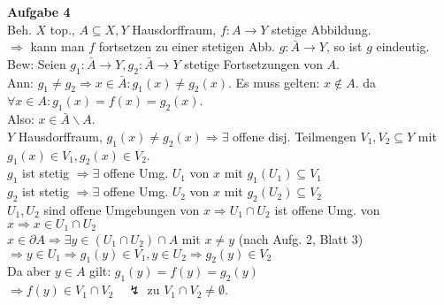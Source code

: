 \documentclass{article}
\begin{document}
\textbf{Aufgabe 4}\\
Beh. $X$ top., $A\subseteq X, Y$ Hausdorffraum, $f: A\rightarrow Y$ stetige Abbildung.\\
$\Rightarrow$ kann man $f$ fortsetzen zu einer stetigen Abb. $g:\bar{A}\rightarrow Y$, so ist $g$ eindeutig.\\
Bew: Seien $g_1: \bar{A}\rightarrow Y, g_2:\bar{A}\rightarrow Y$ stetige Fortsetzungen von $A$.\\
Ann: $g_1\neq g_2 \Rightarrow x\in\bar{A}:g_1(x)\neq g_2(x)$. Es muss gelten: $x\notin A$. da $\forall x\in A: g_1(x)=f(x)=g_2(x)$.\\
Also: $x\in \bar{A}\backslash A$.\\
$Y$ Hausdorffraum, $g_1(x)\neq g_2(x)\Rightarrow\exists$ offene disj. Teilmengen $V_1, V_2\subseteq Y$ mit $g_1(x)\in V_1, g_2(x)\in V_2$.\\
$g_1$ ist stetig $\Rightarrow\exists$ offene Umg. $U_1$ von $x$ mit $g_1(U_1)\subseteq V_1$\\
$g_2$ ist stetig $\Rightarrow\exists$ offene Umg. $U_2$ von $x$ mit $g_2(U_2)\subseteq V_2$\\
$U_1, U_2$ sind offene Umgebungen von $x \Rightarrow U_1\cap U_2$ ist offene Umg. von $x \Rightarrow x\in U_1\cap U_2$\\
$x\in\partial A \Rightarrow\exists y\in(U_1\cap U_2)\cap A$ mit $x\neq y$ (nach Aufg. 2, Blatt 3)\\
$\Rightarrow y\in U_1\Rightarrow g_1(y)\in V_1, y\in U_2\Rightarrow g_2(y)\in V_2$\\
Da aber $y \in A$ gilt: $g_1(y)=f(y)=g_2(y)$\\
$\Rightarrow f(y)\in V_1\cap V_2\quad\lightning$ zu $V_1\cap V_2\neq\emptyset$.
\end{document}
